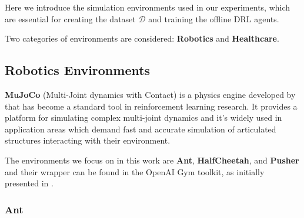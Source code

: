 Here we introduce the simulation environments used in our experiments,
which are essential for creating the dataset \( \mathcal{D} \) and
training the offline DRL agents.

Two categories of environments are considered: \textbf{Robotics} and
\textbf{Healthcare}.

\subsection{Robotics Environments}

\textbf{MuJoCo} (Multi-Joint dynamics with Contact)
is a physics engine developed by \cite{todorov2012mujoco}
that has become a standard tool in reinforcement learning research.
It provides a platform for simulating complex multi-joint dynamics
and it's widely used in application areas which
demand fast and accurate simulation of articulated
structures interacting with their environment.

The environments we focus on in this work are
\textbf{Ant}, \textbf{HalfCheetah}, and \textbf{Pusher}
and their wrapper can be found
in the OpenAI Gym toolkit, as initially
presented in \cite{brockman2016openaigym}.

\subsubsection{Ant}

